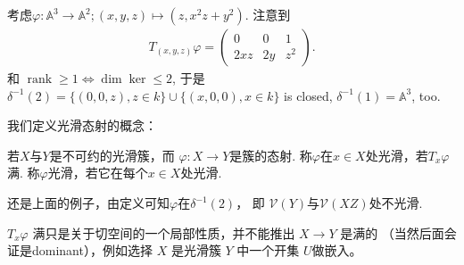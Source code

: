     \begin{example}
      考虑$\varphi\colon\mathbb{A}^{3} \rightarrow \mathbb{A}^{2};
      (x,y,z) \mapsto (z,x^{2}z+y^{2})$. 
      注意到
      \begin{equation*}\begin{aligned}
        T_{(x,y,z)}\varphi =
        \begin{pmatrix}
          0 & 0 & 1 \\
          2xz & 2y & z^{2}
        \end{pmatrix}.
      \end{aligned}\end{equation*}
      和 $\operatorname{rank}\geq 1\Leftrightarrow \dim\ker\leq 2$,
      于是 $\delta^{-1}(2)=\{(0,0,z),z\in k\}\cup \{(x,0,0),x\in k\}$ is closed, 
      $\delta^{-1}(1)=\mathbb{A}^{3}$, too.
    \end{example}


    我们定义光滑态射的概念：
    \begin{definition}
        若$X$与$Y$是不可约的光滑簇，而
        $\varphi\colon X \rightarrow Y$是簇的态射. 
        称$\varphi$在$x \in X$处光滑，若$T_{x}\varphi$满. 
        称$\varphi$光滑，若它在每个$x \in X$处光滑.
    \end{definition}

    \begin{example}
        还是上面的例子，由定义可知$\varphi$在$\delta^{-1}(2)$，
        即 $\mathcal{V}(Y)$与$\mathcal{V}(XZ)$处不光滑. 
    \end{example}

    \begin{remark}
        $T_{x}\varphi$ 满只是关于切空间的一个局部性质，并不能推出 $X\to Y$ 是满的
        （当然后面会证是dominant），例如选择 $X$ 是光滑簇 $Y$ 中一个开集 $U$做嵌入。 
    \end{remark}

